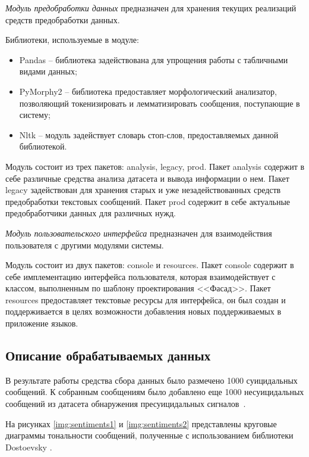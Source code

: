 \textit{Модуль предобработки данных} предназначен для хранения текущих реализаций средств предобработки данных.

Библиотеки, используемые в модуле:
\begin{itemize}
	\item Pandas -- библиотека задействована для упрощения работы с табличными видами данных;
	\item PyMorphy2 -- библиотека предоставляет морфологический анализатор, позволяющий токенизировать и лемматизировать сообщения, поступающие в систему;
	\item Nltk -- модуль задействует словарь стоп-слов, предоставляемых данной библиотекой.
\end{itemize}

Модуль состоит из трех пакетов: analysis, legacy, prod.
Пакет analysis содержит в себе различные средства анализа датасета и вывода информации о нем.
Пакет legacy задействован для хранения старых и уже незадействованных средств предобработки текстовых сообщений.
Пакет prod содержит в себе актуальные предобработчики данных для различных нужд.

\textit{Модуль пользовательского интерфейса} предназначен для взаимодействия пользователя с другими модулями системы.

Модуль состоит из двух пакетов: console и resources.
Пакет console содержит в себе имплементацию интерфейса пользователя, которая взаимодействует с классом, выполненным по шаблону проектирования <<Фасад>>.
Пакет resources предоставляет текстовые ресурсы для интерфейса, он был создан и поддерживается в целях возможности добавления новых поддерживаемых в приложение языков.

\subsection{Описание обрабатываемых данных}

В результате работы средства сбора данных было размечено 1000 суицидальных сообщений. К собранным сообщениям было добавлено еще 1000 несуицидальных сообщений из датасета обнаружения пресуицидальных сигналов~\cite{dataset}. 

На рисунках \ref{img:sentiments1} и \ref{img:sentiments2} представлены круговые диаграммы тональности сообщений, полученные с использованием библиотеки Dostoevsky \cite{dostoevsky}. 

